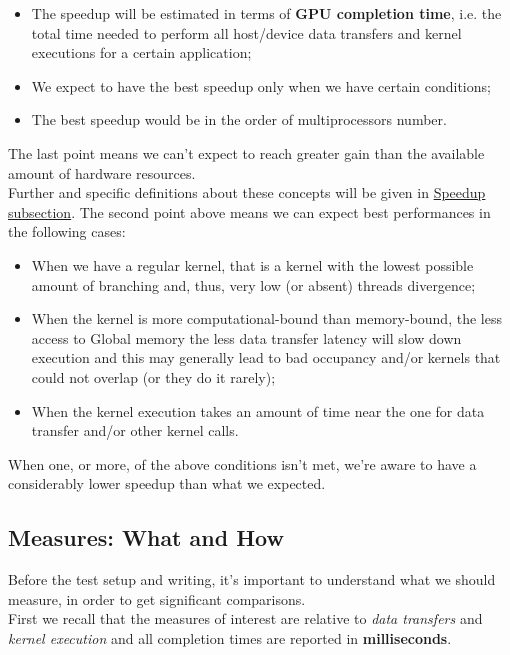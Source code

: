\begin{itemize}
	\item The speedup will be estimated in terms of \textbf{GPU completion time}, i.e. the total time needed to perform all host/device data transfers and kernel executions for a certain application;
	\item We expect to have the best speedup only when we have certain conditions;
	\item The best speedup would be in the order of multiprocessors number.
\end{itemize}
The last point means we can't expect to reach greater gain than the available amount of hardware resources.\\
Further and specific definitions about these concepts will be given in \hyperref[subs:speedup]{Speedup subsection}.
The second point above means we can expect best performances in the following cases:
\begin{itemize}
	\item When we have a regular kernel, that is a kernel with the lowest possible amount of branching and, thus, very low (or absent) threads divergence;
	\item When the kernel is more computational-bound than memory-bound, the less access to Global memory the less data transfer latency will slow down execution and this may generally lead to bad occupancy and/or kernels that could not overlap (or they do it rarely);
	\item When the kernel execution takes an amount of time near the one for data transfer and/or other kernel calls.
\end{itemize} 
When one, or more, of the above conditions isn't met, we're aware to have a considerably lower speedup than what we expected.


\subsection{Measures: What and How}
Before the test setup and writing, it's important to understand what we should measure, in order to get significant comparisons.\\
First we recall that the measures of interest are relative to \textit{data transfers} and \textit{kernel execution} and all completion times are reported in \textbf{milliseconds}. 

